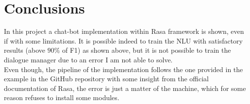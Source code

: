 \documentclass[11pt,a4paper]{article}
\begin{document}
\section{Conclusions}

In this project a chat-bot implementation within Rasa framework is shown, even if with some limitations. It is possible indeed to train the NLU with satisfactory results (above $90\%$ of F1) as shown above, but it is not possible to train the dialogue manager due to an error I am not able to solve.\\

Even though, the pipeline of the implementation follows the one provided in the example in the GitHub repository with some insight from the official documentation of Rasa, the error is just a matter of the machine, which for some reason refuses to install some modules.
\end{document}
